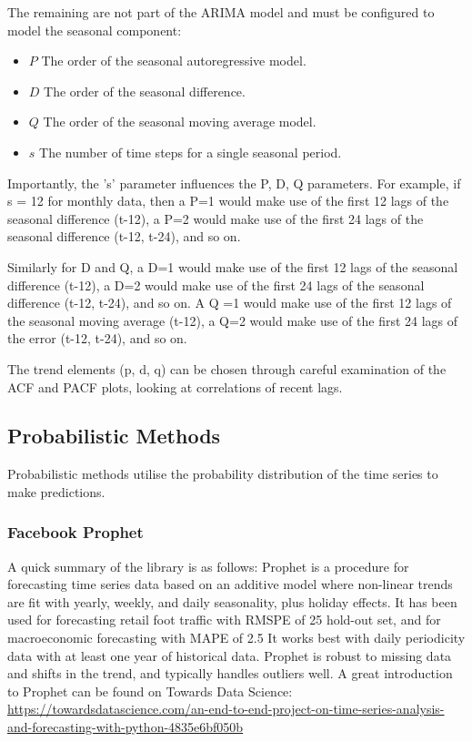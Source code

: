 \documentclass[manuscript,screen,nonacm,11pt]{acmart}
\numberwithin{equation}{section}
\begin{document}
The remaining are not part of the ARIMA model and must be configured to
model the seasonal component:
\begin{itemize}
\item $P$ The order of the seasonal autoregressive model.
\item $D$ The order of the seasonal difference.
\item $Q$ The order of the seasonal moving average model.
\item $s$ The number of time steps for a single seasonal period.
\end{itemize}

Importantly, the 's' parameter influences the P, D, Q parameters. 
For example, if s = 12 for monthly data, then a P=1 would make use of 
the first 12 lags of the seasonal difference (t-12), a P=2 would make 
use of the first 24 lags of the seasonal difference (t-12, t-24), and so on.

Similarly for D and Q, a D=1 would make use of the first 12 lags of 
the seasonal difference (t-12), a D=2 would make use of the first 24
lags of the seasonal difference (t-12, t-24), and so on. 
A Q =1 would make use of the first 12 lags of the seasonal moving 
average (t-12), a Q=2 would make use of the first 24 lags of the error
(t-12, t-24), and so on.

The trend elements (p, d, q) can be chosen through careful examination 
of the ACF and PACF plots, looking at correlations of recent lags.

\subsection{Probabilistic Methods}
Probabilistic methods utilise the probability distribution of the time series to make predictions.

\subsubsection{Facebook Prophet}
A quick summary of the library is as follows: 
    Prophet is a procedure for forecasting time series data based on an additive model 
    where non-linear trends are fit with yearly, weekly, and daily seasonality, plus 
    holiday effects.
    It has been used for forecasting retail foot traffic with RMSPE of 25%
    hold-out set, and for macroeconomic forecasting with MAPE of 2.5%
    It works best with daily periodicity data with at least one year of historical data.
    Prophet is robust to missing data and shifts in the trend, and typically handles outliers
    well.
    A great introduction to Prophet can be found on Towards Data Science:
    \url{https://towardsdatascience.com/an-end-to-end-project-on-time-series-analysis-and-forecasting-with-python-4835e6bf050b}
\end{document}
